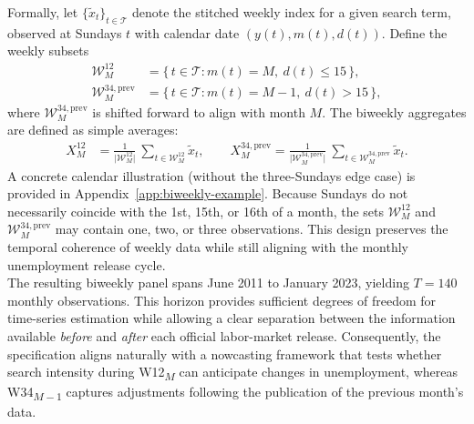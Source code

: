 \documentclass[12pt,a4paper]{article}
\begin{document}
Formally, let $\{\tilde{x}_t\}_{t \in \mathcal{T}}$ denote the stitched weekly index for a given search term, observed at Sundays $t$ with calendar date $(y(t),m(t),d(t))$. Define the weekly subsets
\begin{align}
\mathcal{W}^{12}_{M} 
&= \big\{\, t \in \mathcal{T} : m(t)=M,\ d(t)\le 15 \,\big\}, \label{eq:w12set}\\
\mathcal{W}^{34,\text{prev}}_{M}
&= \big\{\, t \in \mathcal{T} : m(t)=M-1,\ d(t)> 15 \,\big\}, \label{eq:w34set}
\end{align}
where $\mathcal{W}^{34,\text{prev}}_{M}$ is shifted forward to align with month $M$. The biweekly aggregates are defined as simple averages:
\begin{align}
X^{12}_{M} 
&= \frac{1}{\lvert \mathcal{W}^{12}_{M}\rvert}\ \sum_{t \in \mathcal{W}^{12}_{M}} \tilde{x}_t, 
\qquad
X^{34,\text{prev}}_{M} 
= \frac{1}{\lvert \mathcal{W}^{34,\text{prev}}_{M}\rvert}\ \sum_{t \in \mathcal{W}^{34,\text{prev}}_{M}} \tilde{x}_t.
\label{eq:w12w34means}
\end{align}
A concrete calendar illustration (without the three-Sundays edge case) is provided in Appendix~\ref{app:biweekly-example}.
Because Sundays do not necessarily coincide with the 1st, 15th, or 16th of a month, the sets $\mathcal{W}^{12}_{M}$ and $\mathcal{W}^{34,\text{prev}}_{M}$ may contain one, two, or three observations. This design preserves the temporal coherence of weekly data while still aligning with the monthly unemployment release cycle.\\
The resulting biweekly panel spans June 2011 to January 2023, yielding $T = 140$ monthly observations. This horizon provides sufficient degrees of freedom for time-series estimation while allowing a clear separation between the information available \emph{before} and \emph{after} each official labor-market release. Consequently, the specification aligns naturally with a nowcasting framework that tests whether search intensity during W12\textsubscript{$M$} can anticipate changes in unemployment, whereas W34\textsubscript{$M-1$} captures adjustments following the publication of the previous month’s data.
\end{document}
